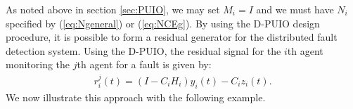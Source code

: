 \documentclass[letterpaper, 10 pt, conference]{ieeeconf}  %
\begin{document}
As noted above in section \ref{sec:PUIO}, we may set $M_i=I$ and we must have $N_i$ specified by (\ref{eq:Ngeneral}) or (\ref{eq:NCEg}). By using the D-PUIO design procedure, it is possible to form a residual generator for the distributed fault detection system. Using the D-PUIO, the residual signal for the $i$th agent monitoring the $j$th agent for a fault is given by:
\begin{align} \label{eq:resGenDist}
r_i^j (t) = (I - C_i H_i ) y_i (t) - C_i z_i (t).
\end{align}
We now illustrate this approach with the following example.
\end{document}
